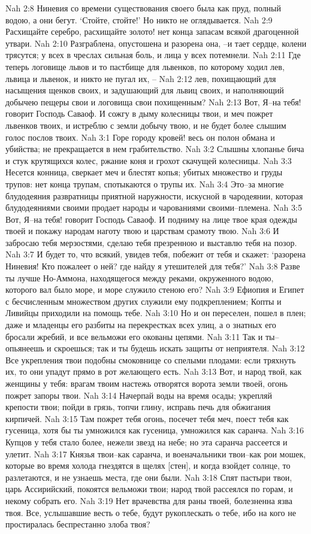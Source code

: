 Nah 2:8  Ниневия со времени существования своего была как пруд, полный водою, а они бегут. `Стойте, стойте!' Но никто не оглядывается.
Nah 2:9  Расхищайте серебро, расхищайте золото! нет конца запасам всякой драгоценной утвари.
Nah 2:10  Разграблена, опустошена и разорена она, --и тает сердце, колени трясутся; у всех в чреслах сильная боль, и лица у всех потемнели.
Nah 2:11  Где теперь логовище львов и то пастбище для львенков, по которому ходил лев, львица и львенок, и никто не пугал их, --
Nah 2:12  лев, похищающий для насыщения щенков своих, и задушающий для львиц своих, и наполняющий добычею пещеры свои и логовища свои похищенным?
Nah 2:13  Вот, Я--на тебя! говорит Господь Саваоф. И сожгу в дыму колесницы твои, и меч пожрет львенков твоих, и истреблю с земли добычу твою, и не будет более слышим голос послов твоих.
Nah 3:1  Горе городу кровей! весь он полон обмана и убийства; не прекращается в нем грабительство.
Nah 3:2  Слышны хлопанье бича и стук крутящихся колес, ржание коня и грохот скачущей колесницы.
Nah 3:3  Несется конница, сверкает меч и блестят копья; убитых множество и груды трупов: нет конца трупам, спотыкаются о трупы их.
Nah 3:4  Это--за многие блудодеяния развратницы приятной наружности, искусной в чародеянии, которая блудодеяниями своими продает народы и чарованиями своими--племена.
Nah 3:5  Вот, Я--на тебя! говорит Господь Саваоф. И подниму на лице твое края одежды твоей и покажу народам наготу твою и царствам срамоту твою.
Nah 3:6  И забросаю тебя мерзостями, сделаю тебя презренною и выставлю тебя на позор.
Nah 3:7  И будет то, что всякий, увидев тебя, побежит от тебя и скажет: `разорена Ниневия! Кто пожалеет о ней? где найду я утешителей для тебя?'
Nah 3:8  Разве ты лучше Но-Аммона, находящегося между реками, окруженного водою, которого вал было море, и море служило стеною его?
Nah 3:9  Ефиопия и Египет с бесчисленным множеством других служили ему подкреплением; Копты и Ливийцы приходили на помощь тебе.
Nah 3:10  Но и он переселен, пошел в плен; даже и младенцы его разбиты на перекрестках всех улиц, а о знатных его бросали жребий, и все вельможи его окованы цепями.
Nah 3:11  Так и ты--опьянеешь и скроешься; так и ты будешь искать защиты от неприятеля.
Nah 3:12  Все укрепления твои подобны смоковнице со спелыми плодами: если тряхнуть их, то они упадут прямо в рот желающего есть.
Nah 3:13  Вот, и народ твой, как женщины у тебя: врагам твоим настежь отворятся ворота земли твоей, огонь пожрет запоры твои.
Nah 3:14  Начерпай воды на время осады; укрепляй крепости твои; пойди в грязь, топчи глину, исправь печь для обжигания кирпичей.
Nah 3:15  Там пожрет тебя огонь, посечет тебя меч, поест тебя как гусеница, хотя бы ты умножился как гусеница, умножился как саранча.
Nah 3:16  Купцов у тебя стало более, нежели звезд на небе; но эта саранча рассеется и улетит.
Nah 3:17  Князья твои--как саранча, и военачальники твои--как рои мошек, которые во время холода гнездятся в щелях [стен], и когда взойдет солнце, то разлетаются, и не узнаешь места, где они были.
Nah 3:18  Спят пастыри твои, царь Ассирийский, покоятся вельможи твои; народ твой рассеялся по горам, и некому собрать его.
Nah 3:19  Нет врачевства для раны твоей, болезненна язва твоя. Все, услышавшие весть о тебе, будут рукоплескать о тебе, ибо на кого не простиралась беспрестанно злоба твоя?


